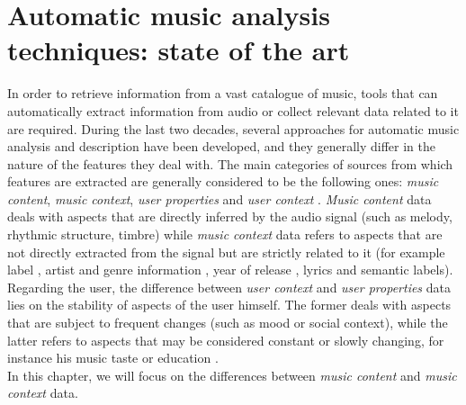 \chapter{Automatic music analysis techniques: state of the art} 
\label{Chapter2} 

In order to retrieve information from a vast catalogue of music, tools that can automatically extract information from audio or collect relevant data related to it are required. During the last two decades, several approaches for automatic music analysis and description have been developed, and they generally differ in the nature of the features they deal with. The main categories of sources from which features are extracted are generally considered to be the following ones: \textit{music content}, \textit{music context}, \textit{user properties} and \textit{user context} \cite{gomez14}. \textit{Music content} data deals with aspects that are directly inferred by the audio signal (such as melody, rhythmic structure, timbre) while \textit{music context} data refers to aspects that are not directly extracted from the signal but are strictly related to it (for example label \cite{pachet00}, artist and genre information \cite{perfe11} \cite{aizenberg12}, year of release \cite{vangulik05}, lyrics \cite{coelho13} and semantic labels). Regarding the user, the difference between \textit{user context} and \textit{user properties} data lies on the stability of aspects of the user himself. The former deals with aspects that are subject to frequent changes (such as mood or social context), while the latter refers to aspects that may be considered constant or slowly changing, for instance his music taste or education \cite{gomez14}. \\In this chapter, we will focus on the differences between \textit{music content} and \textit{music context} data. 


